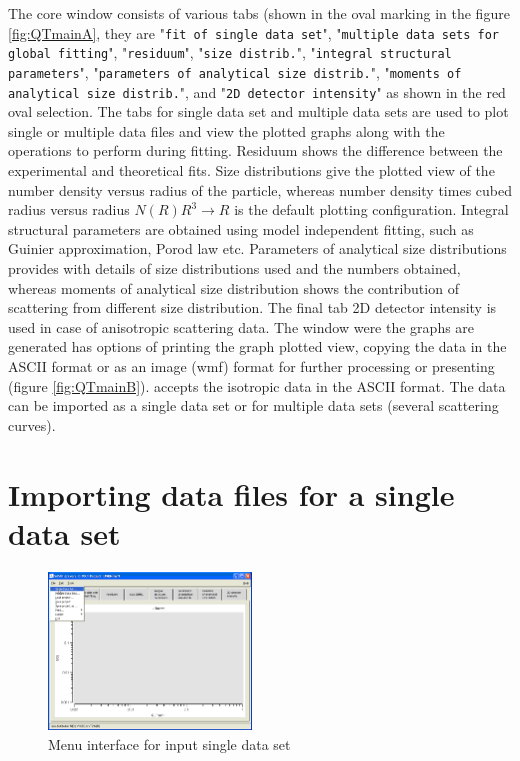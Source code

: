 \sloppy
The core \SASfit window consists of various tabs (shown in the oval
marking in the figure \ref{fig:QTmainA}, they are "\texttt{fit of single data set}",
"\texttt{multiple data sets for global fitting}", "\texttt{residuum}", "\texttt{size
distrib.}", "\texttt{integral structural parameters}", "\texttt{parameters of
analytical size distrib.}", "\texttt{moments of analytical size
distrib.}", and "\texttt{2D detector intensity}" as shown in the red oval
selection. The tabs for single data set and multiple data sets are used to
plot single or multiple data files and view the plotted graphs along
with the operations to perform during fitting. Residuum shows the
difference between the experimental and theoretical fits. Size
distributions give the plotted view of the number density versus radius
of the particle, whereas number density times cubed radius versus radius $N(R)R^3\rightarrow R$ is the default plotting configuration. Integral structural parameters are obtained using model independent fitting, such as Guinier approximation, Porod law etc. Parameters of analytical size distributions provides with details of size distributions used and the numbers obtained, whereas
moments of analytical size distribution shows the contribution of
scattering from different size distribution. The final tab 2D
detector intensity is used in case of anisotropic scattering data.
The window were the graphs are generated has options of printing the
graph plotted view, copying the data in the ASCII format or as an
image (wmf) format for further processing or presenting (figure
\ref{fig:QTmainB}). \SASfit accepts the isotropic data in the ASCII
format. The data can be imported as a single data set or for
multiple data sets (several scattering curves).

\section{Importing data files for a single data set}
\begin{figure}[htb]
\includegraphics[width=0.48\textwidth]{QTloadingSingleDS.png}
\caption{Menu interface for input single data set}
\label{fig:QTloadingSingleDS}
\end{figure}

